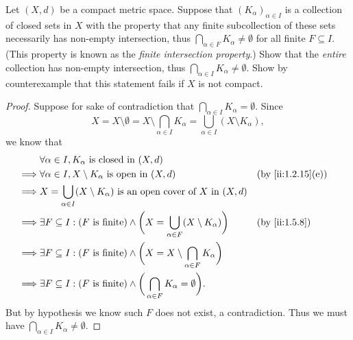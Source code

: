 \begin{ex}\label{ii:ex:1.5.15}
  Let \((X, d)\) be a compact metric space.
  Suppose that \((K_{\alpha})_{\alpha \in I}\) is a collection of closed sets in \(X\) with the property that any finite subcollection of these sets necessarily has non-empty intersection, thus \(\bigcap_{\alpha \in F} K_{\alpha} \neq \emptyset\) for all finite \(F \subseteq I\).
  (This property is known as the \emph{finite intersection property}.)
  Show that the \emph{entire} collection has non-empty intersection, thus \(\bigcap_{\alpha \in I} K_{\alpha} \neq \emptyset\).
  Show by counterexample that this statement fails if \(X\) is not compact.
\end{ex}

\begin{proof}
  Suppose for sake of contradiction that \(\bigcap_{\alpha \in I} K_\alpha = \emptyset\).
  Since
  \[
    X = X \setminus \emptyset = X \setminus \bigcap_{\alpha \in I} K_\alpha = \bigcup_{\alpha \in I} (X \setminus K_\alpha),
  \]
  we know that
  \begin{align*}
             & \forall \alpha \in I, K_\alpha \text{ is closed in } (X, d)                                                                              \\
    \implies & \forall \alpha \in I, X \setminus K_\alpha \text{ is open in } (X, d)                                             &  & \by{ii:1.2.15}[e] \\
    \implies & X = \bigcup_{\alpha \in I} (X \setminus K_\alpha) \text{ is an open cover of } X \text{ in } (X, d)                                      \\
    \implies & \exists F \subseteq I : (F \text{ is finite}) \land \bigg(X = \bigcup_{\alpha \in F} (X \setminus K_\alpha)\bigg) &  & \by{ii:1.5.8}     \\
    \implies & \exists F \subseteq I : (F \text{ is finite}) \land \bigg(X = X \setminus \bigcap_{\alpha \in F} K_\alpha\bigg)                          \\
    \implies & \exists F \subseteq I : (F \text{ is finite}) \land \bigg(\bigcap_{\alpha \in F} K_\alpha = \emptyset\bigg).
  \end{align*}
  But by hypothesis we know such \(F\) does not exist, a contradiction.
  Thus we must have \(\bigcap_{\alpha \in I} K_\alpha \neq \emptyset\).


\end{proof}
